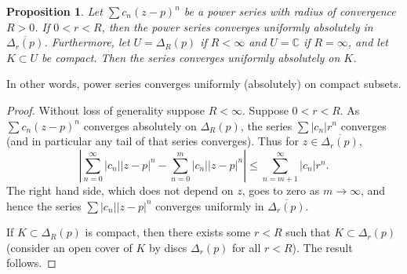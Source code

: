 \documentclass[12pt,openany]{book}
\newcommand{\sabs}[1]{\lvert {#1} \rvert}
\newcommand{\abs}[1]{\left\lvert {#1} \right\rvert}
\newcommand{\C}{{\mathbb{C}}}
\theoremstyle{plain}
\newtheorem{prop}[thm]{Proposition}
\theoremstyle{remark}
\theoremstyle{definition}
\theoremstyle{exercise}
\theoremstyle{example}
\begin{document}
\begin{prop}
Let $\sum c_n {(z-p)}^n$ be a power series with radius of convergence $R
> 0$.  If $0 < r < R$, then the power series converges uniformly absolutely
in $\overline{\Delta_r(p)}$. Furthermore, let $U = \Delta_R(p)$ if $R < \infty$ and
$U = \C$ if $R=\infty$, and let $K \subset U$ be compact.
Then the series converges uniformly absolutely on $K$.
\end{prop}

In other words, power series converges uniformly (absolutely) on
compact subsets.

\begin{proof}
Without loss of generality suppose $R < \infty$.
Suppose $0 < r < R$.  As $\sum c_n {(z-p)}^n$ converges absolutely
on $\Delta_R(p)$, the series
$\sum \sabs{c_n} r^n$ converges (and in particular any tail of
that series converges).  Thus for $z \in \overline{\Delta_r(p)}$,
\begin{equation*}
\abs{
\sum_{n=0}^\infty \sabs{c_n} \sabs{z-p}^n
-
\sum_{n=0}^{m} \sabs{c_n} \sabs{z-p}^n
}
\leq
\sum_{n=m+1}^\infty \sabs{c_n} r^n .
\end{equation*}
The right hand side, which does not depend on $z$,
goes to zero as $m \to \infty$, and hence 
the series $\sum \sabs{c_n} \sabs{z-p}^n$ converges uniformly in $\overline{\Delta_r(p)}$.

If $K \subset \Delta_{R}(p)$ is compact, then there exists some $r <
R$ such that $K \subset \Delta_r(p)$ (consider an open cover of
$K$ by discs $\Delta_r(p)$ for all $r < R$).  The result follows.
\end{proof}
\end{document}
